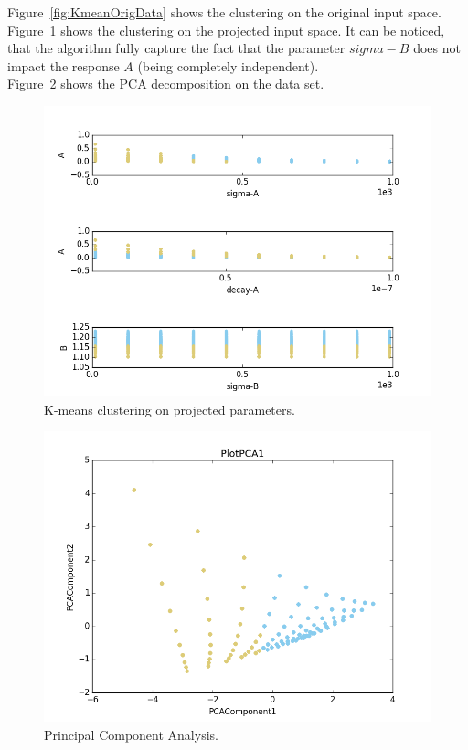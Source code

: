 Figure~\ref{fig:KmeanOrigData} shows the clustering on the original
input space.
\\Figure~\ref{fig:KmeanProjected} shows the clustering on the projected
input space. It can be noticed, that the algorithm fully capture the fact
that the parameter $sigma-B$ does not impact the response $A$ (being completely independent).
\\Figure~\ref{fig:PCAplot} shows the PCA decomposition on the data set.
 \begin{figure}[h!]
  \centering
  \includegraphics[scale=0.7]{pics/dataminingPlotallK-means.png}
  \caption{K-means clustering on projected parameters.}
  \label{fig:KmeanProjected}
 \end{figure}

 \begin{figure}[h!]
  \centering
  \includegraphics[scale=0.7]{pics/dataminingPCA.png}
  \caption{Principal Component Analysis.}
  \label{fig:PCAplot}
 \end{figure}

